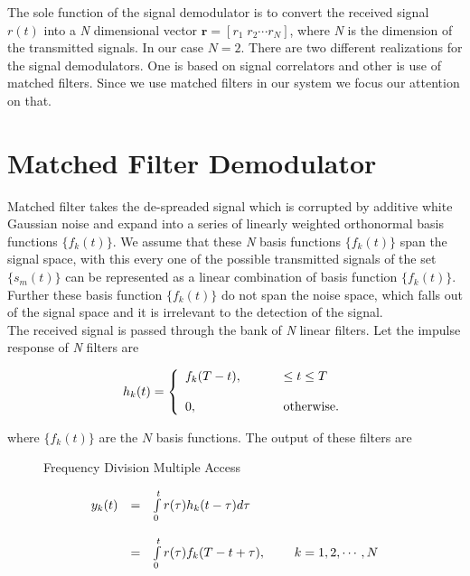 The sole function of the signal demodulator is to convert the received signal $r(t)$ into a \textit{N} dimensional vector $\mathrm{\mathbf{r}}=[r_1\; r_2 \cdots r_N]$, where \textit{N} is the dimension of the transmitted signals. In our case $N=2$. There are two different realizations for the signal demodulators. One is based on signal correlators and other is use of matched filters. Since we use matched filters in our system we focus our attention on that.

\section{Matched Filter Demodulator}

Matched filter takes the de-spreaded signal which is corrupted by additive white Gaussian noise and expand into a series of linearly weighted orthonormal basis functions $\{f_k(t)\}$. We assume that these \textit{N} basis functions $\{f_k(t)\}$ span the signal space, with this every one of the possible transmitted signals of the set $\{s_m(t)\}$ can be represented as a linear combination of basis function $\{f_k(t)\}$. Further these basis function $\{f_k(t)\}$ do not span the noise space, which falls out of the signal space and it is irrelevant to the detection of the signal. \\

The received signal is passed through the bank of \textit{N} linear filters. Let the impulse response of \textit{N} filters are 

\begin{eqnarray}
h_k(t)=\left \{
\begin{array}{lll}
f_k(T-t),&\hspace{5mm}&\leq t \leq T \\ \\ 
0,& \hspace{5mm} &\mathrm{otherwise.} 
\end{array}
\right .
\end{eqnarray}

where $\{f_k(t)\}$ are the $N$ basis functions. The output of these filters are 

\begin{figure}[htb]
  \centerline{  }
  \caption{Frequency Division Multiple Access}
\end{figure}

\begin{eqnarray}
\begin{array}{llll}
y_k(t)&=&\int\limits_{0}^{t}r(\tau)h_k(t-\tau)d\tau \\ \\
&=&\int\limits_{0}^{t}r(\tau)f_k(T-t+\tau),&\hspace{5mm}k=1,2,\cdots,N
\end{array}
\end{eqnarray}

